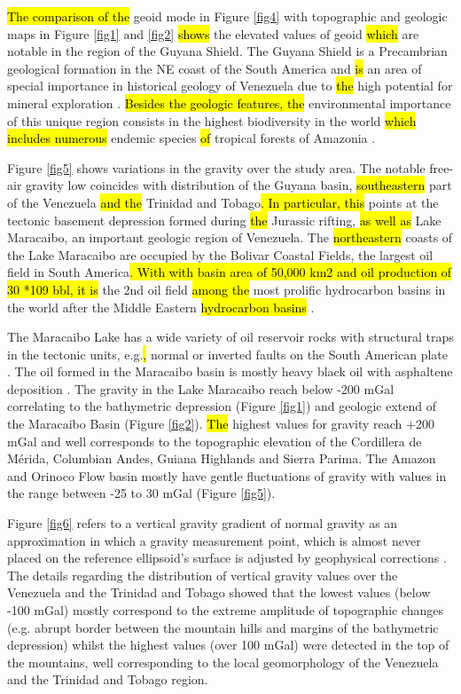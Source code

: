 \documentclass[sustainability,article,submit,pdftex,moreauthors]{Definitions/mdpi}
\begin{document}
\hl{ The comparison of the }geoid mode in Figure \ref{fig4} with topographic and geologic maps in Figure \ref{fig1} and \ref{fig2}\hl{ shows }the elevated values of geoid\hl{ which }are notable in the region of the Guyana Shield. The Guyana Shield is a Precambrian geological formation in the NE coast of the South America and \hl{is }an area of special importance in historical geology of Venezuela due to \hl{the }high potential for mineral exploration \cite{Gibbs}. \hl{Besides the geologic features, the }environmental importance of this unique region consists in the highest biodiversity in the world\hl{ which includes numerous }endemic species \cite{Hollowell} \hl{of }tropical forests of Amazonia \cite{Hammond}. 

Figure \ref{fig5} shows variations in the gravity over the study area. The notable free-air gravity low coincides with distribution of the Guyana basin, \hl{southeastern} part of the Venezuela\hl{ and the }Trinidad and Tobago\hl{. In particular, this }points at the tectonic basement depression formed during \hl{the }Jurassic rifting, \hl{as well as }Lake Maracaibo, an important geologic region of Venezuela. The \hl{northeastern }coasts of the Lake Maracaibo are occupied by the Bolivar Coastal Fields, the largest oil field in South America\hl{. With with basin area of 50,000 km2 and oil production of 30 *109 bbl, it is }the 2nd oil field\hl{ among the }most prolific hydrocarbon basins in the world after the Middle Eastern\hl{ hydrocarbon basins }\cite{Escalona}.   

The Maracaibo Lake has a wide variety of oil reservoir rocks with structural traps in the tectonic units, e.g.\hl{, }normal or inverted faults on the South American plate \cite{Bockmeulen}. The oil formed in the Maracaibo basin is mostly heavy black oil with asphaltene deposition \cite{Escobar,Memon}. The gravity in the Lake Maracaibo reach below -200 mGal correlating to the bathymetric depression (Figure \ref{fig1}) and geologic extend of the Maracaibo Basin (Figure \ref{fig2}).\hl{ The }highest values for gravity reach +200 mGal and well corresponds to the topographic elevation of the Cordillera de Mérida, Columbian Andes, Guiana Highlands and Sierra Parima. The Amazon and Orinoco Flow basin mostly have gentle fluctuations of gravity with values in the range between -25 to 30 mGal (Figure \ref{fig5}).

Figure \ref{fig6} refers to a vertical gravity gradient of normal gravity as an approximation in which a gravity measurement point, which is almost never placed on the reference ellipsoid’s surface is adjusted by geophysical corrections \citep{Li,Yilmaz}. The details regarding the distribution of vertical gravity values over the Venezuela and the Trinidad and Tobago showed that the lowest values (below -100 mGal) mostly correspond to the extreme amplitude of topographic changes (e.g. abrupt border between the mountain hills and margins of the bathymetric depression) whilst the highest values (over 100 mGal) were detected in the top of the mountains, well corresponding to the local geomorphology of the Venezuela and the Trinidad and Tobago region.
\end{document}
